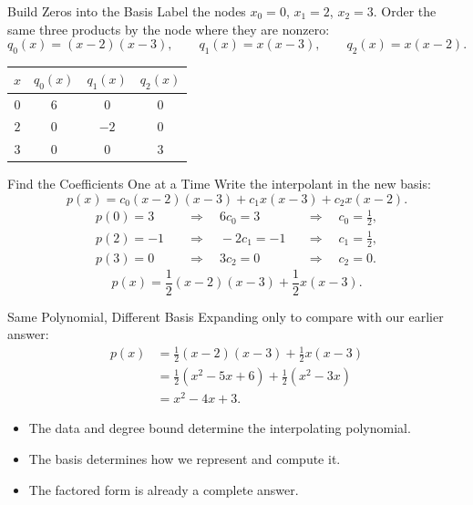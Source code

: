 \documentclass[10pt]{beamer}
\begin{document}
\begin{frame}{Build Zeros into the Basis}
Label the nodes $x_0=0$, $x_1=2$, $x_2=3$.
Order the same three products by the node where they are nonzero:
\[
q_0(x)=(x-2)(x-3),\qquad
q_1(x)=x(x-3),\qquad
q_2(x)=x(x-2).
\]
\begin{center}
\renewcommand{\arraystretch}{1.4}
\begin{tabular}{c|ccc}
$x$ & $q_0(x)$ & $q_1(x)$ & $q_2(x)$\\ \hline
$0$ & $6$ & $0$ & $0$\\
$2$ & $0$ & $-2$ & $0$\\
$3$ & $0$ & $0$ & $3$
\end{tabular}
\end{center}
\end{frame}

\begin{frame}{Find the Coefficients One at a Time}
Write the interpolant in the new basis:
\[
p(x)=c_0(x-2)(x-3)+c_1x(x-3)+c_2x(x-2).
\]
\begin{align*}
p(0)=3 &\quad\Longrightarrow\quad 6c_0=3
    &&\Longrightarrow\quad c_0=\tfrac12,\\[2mm]
p(2)=-1 &\quad\Longrightarrow\quad -2c_1=-1
    &&\Longrightarrow\quad c_1=\tfrac12,\\[2mm]
p(3)=0 &\quad\Longrightarrow\quad 3c_2=0
    &&\Longrightarrow\quad c_2=0.
\end{align*}
\[
\boxed{p(x)=\frac12(x-2)(x-3)+\frac12x(x-3).}
\]
\end{frame}

\begin{frame}{Same Polynomial, Different Basis}
Expanding only to compare with our earlier answer:
\[
\begin{aligned}
p(x)&=\frac12(x-2)(x-3)+\frac12x(x-3)\\
&=\frac12(x^2-5x+6)+\frac12(x^2-3x)\\
&=\boxed{x^2-4x+3}.
\end{aligned}
\]
\begin{itemize}
    \item The data and degree bound determine the interpolating polynomial.
    \item The basis determines how we represent and compute it.
    \item The factored form is already a complete answer.
\end{itemize}
\end{frame}
\end{document}
